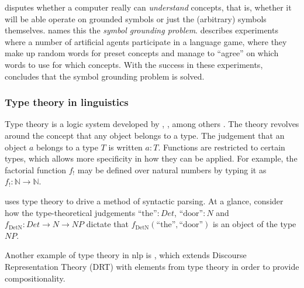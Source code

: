 \cite{SearleMindsbrainsprograms1980} disputes whether a computer really can \textit{understand} concepts, that is, whether it will be able operate on grounded symbols or just the (arbitrary) symbols themselves.
\cite{HarnadSymbolGroundingProblem1990} names this the \textit{symbol grounding problem}.
\cite{SteelsSymbolGroundingProblem2007} describes experiments where a number of artificial agents participate in a language game, where they make up random words for preset concepts and manage to ``agree'' on which words to use for which concepts.
With the success in these experiments, \citeauthor{SteelsSymbolGroundingProblem2007} concludes that the symbol grounding problem is solved.



\subsubsection{Type theory in linguistics}

Type theory is a logic system developed by \cite{WhiteheadPrincipiamathematica1910}, \cite{church40}, \cite{martinlof84} among others \citep{CoquandTypeTheory2015}.
The theory revolves around the concept that any object belongs to a type.
The judgement that an object $a$ belongs to a type $T$ is written $a:T$.
Functions are restricted to certain types, which allows more specificity in how they can be applied.
For example, the factorial function $f_!$ may be defined over natural numbers by typing it as $f_! :\mathbb{N} \rightarrow \mathbb{N}$.

\cite{RantaTypetheoreticalGrammar1995} uses type theory to drive a method of syntactic parsing.
At a glance, consider how the type-theoretical judgements $\text{``the''} : \mathit{Det}$, $\text{``door''} : \mathit{N}$ and $f_\text{DetN}:\mathit{Det}\rightarrow\mathit{N}\rightarrow\mathit{NP}$ dictate that $f_\text{DetN}(\text{``the''}, \text{``door''})$ is an object of the type $\mathit{NP}$.

Another example of type theory in \gls{nlp} is \cite{KohlhaseTypeTheoreticSemanticslDRT1996}, which extends Discourse Representation Theory (DRT) with elements from type theory in order to provide compositionality.




